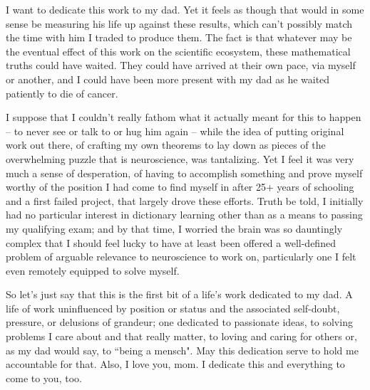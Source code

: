 \documentclass{ucbthesis}
\begin{document}
\begin{frontmatter}

\begin{dedication}
\null\vfil
I want to dedicate this work to my dad. Yet it feels as though that would in some sense be measuring his life up against these results, which can't possibly match the time with him I traded to produce them. The fact is that whatever may be the eventual effect of this work on the scientific ecosystem, these mathematical truths could have waited. They could have arrived at their own pace, via myself or another, and I could have been more present with my dad as he waited patiently to die of cancer. 

I suppose that I couldn't really fathom what it actually meant for this to happen -- to never see or talk to or hug him again -- while the idea of putting original work out there, of crafting my own theorems to lay down as pieces of the overwhelming puzzle that is neuroscience, was tantalizing. Yet I feel it was very much a sense of desperation, of having to accomplish something and prove myself worthy of the position I had come to find myself in after 25+ years of schooling and a first failed project, that largely drove these efforts. Truth be told, I initially had no particular interest in dictionary learning other than as a means to passing my qualifying exam; and by that time, I worried the brain was so dauntingly complex that I should feel lucky to have at least been offered a well-defined problem of arguable relevance to neuroscience to work on, particularly one I felt even remotely equipped to solve myself.

So let's just say that this is the first bit of a life's work dedicated to my dad. A life of work uninfluenced by position or status and the associated self-doubt, pressure, or delusions of grandeur; one dedicated to passionate ideas, to solving problems I care about and that really matter, to loving and caring for others or, as my dad would say, to ``being a mensch". May this dedication serve to hold me accountable for that. Also, I love you, mom. I dedicate this and everything to come to you, too.

\vspace{12pt}
\vfil\null
\end{dedication}



\end{frontmatter}
\end{document}
